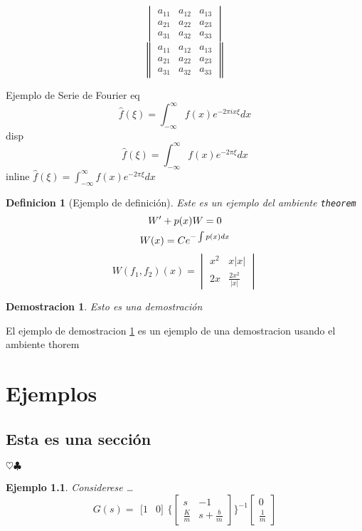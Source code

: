 \documentclass{report}
\newcommand{\Fourier}[1][eq] {
	\IfEqCase {#1} {	%
		{eq} {
			\begin{equation}
			\hat{f}(\xi)=\int_{-\infty}^{\infty}f(x)e^{-2\pi ix \xi}dx
			\end{equation}
		}
		{disp} {
			\[
			\hat{f}(\xi)=\int_{-\infty}^{\infty}f(x)e^{-2\pi\xi}dx
			\]
		}
		{inline} {	%
			$\hat{f}(\xi)=\int_{-\infty}^{\infty}f(x)e^{-2\pi\xi}dx$}
	}
}
\newtheorem{theorem}{Definicion}
\newtheorem{demo}{Demostracion}
\newtheorem{Ejem}{Ejemplo}[section]
\begin{document}
\[
\begin{vmatrix}
a_{11} & a_{12} & a_{13}\\
a_{21} & a_{22} & a_{23}\\
a_{31} & a_{32} & a_{33}
\end{vmatrix}
\]
\[
\begin{Vmatrix}
a_{11} & a_{12} & a_{13}\\
a_{21} & a_{22} & a_{23}\\
a_{31} & a_{32} & a_{33}
\end{Vmatrix}
\]

Ejemplo de Serie de Fourier \Fourier[eq]


\begin{theorem}[Ejemplo de definición]
	Este es un ejemplo del ambiente \texttt{theorem}
\begin{gather}
W' + p(x)W=0 \\
W(x) = Ce^{-\int p(x) dx}	\notag 	%
\end{gather}
\[
W(f_1, f_2)(x)=
\begin{vmatrix}
x^2 & x|x|\\2x & \frac{2x^2}{|x|}
\end{vmatrix}
\]
\end{theorem}

\begin{demo}%
	Esto es una demostración
	\label{dem:Ejemplo}
\end{demo}
El ejemplo de demostracion \ref{dem:Ejemplo} es un ejemplo de una demostracion usando el ambiente thorem

\chapter{Ejemplos}
\lipsum[2-2]
\section{Esta es una sección}
$\heartsuit\clubsuit$

\lipsum[2-2]
\begin{Ejem}
	Considerese \dots \lipsum[2-2]
	\begin{equation}
	G(s)=\begin{array}{cc}
	[1& 0]
	\end{array} 
	\Biggl\{
	\left[
	\begin{array}{cc}
		s&-1\\\frac{K}{m}&s+\frac{b}{m}
	\end{array}
	\right]
	\Biggr\}^{-1}
	\left[
	\begin{array}{c}
		0\\\frac{1}{m}
	\end{array}
	\right]
\end{equation}

	\end{Ejem}
\end{document}
